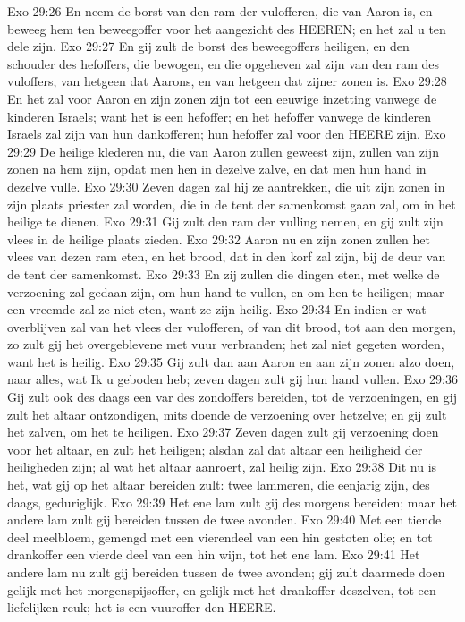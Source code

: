 Exo 29:26  En neem de borst van den ram der vulofferen, die van Aaron is, en beweeg hem ten beweegoffer voor het aangezicht des HEEREN; en het zal u ten dele zijn.
Exo 29:27  En gij zult de borst des beweegoffers heiligen, en den schouder des hefoffers, die bewogen, en die opgeheven zal zijn van den ram des vuloffers, van hetgeen dat Aarons, en van hetgeen dat zijner zonen is.
Exo 29:28  En het zal voor Aaron en zijn zonen zijn tot een eeuwige inzetting vanwege de kinderen Israels; want het is een hefoffer; en het hefoffer vanwege de kinderen Israels zal zijn van hun dankofferen; hun hefoffer zal voor den HEERE zijn.
Exo 29:29  De heilige klederen nu, die van Aaron zullen geweest zijn, zullen van zijn zonen na hem zijn, opdat men hen in dezelve zalve, en dat men hun hand in dezelve vulle.
Exo 29:30  Zeven dagen zal hij ze aantrekken, die uit zijn zonen in zijn plaats priester zal worden, die in de tent der samenkomst gaan zal, om in het heilige te dienen.
Exo 29:31  Gij zult den ram der vulling nemen, en gij zult zijn vlees in de heilige plaats zieden.
Exo 29:32  Aaron nu en zijn zonen zullen het vlees van dezen ram eten, en het brood, dat in den korf zal zijn, bij de deur van de tent der samenkomst.
Exo 29:33  En zij zullen die dingen eten, met welke de verzoening zal gedaan zijn, om hun hand te vullen, en om hen te heiligen; maar een vreemde zal ze niet eten, want ze zijn heilig.
Exo 29:34  En indien er wat overblijven zal van het vlees der vulofferen, of van dit brood, tot aan den morgen, zo zult gij het overgeblevene met vuur verbranden; het zal niet gegeten worden, want het is heilig.
Exo 29:35  Gij zult dan aan Aaron en aan zijn zonen alzo doen, naar alles, wat Ik u geboden heb; zeven dagen zult gij hun hand vullen.
Exo 29:36  Gij zult ook des daags een var des zondoffers bereiden, tot de verzoeningen, en gij zult het altaar ontzondigen, mits doende de verzoening over hetzelve; en gij zult het zalven, om het te heiligen.
Exo 29:37  Zeven dagen zult gij verzoening doen voor het altaar, en zult het heiligen; alsdan zal dat altaar een heiligheid der heiligheden zijn; al wat het altaar aanroert, zal heilig zijn.
Exo 29:38  Dit nu is het, wat gij op het altaar bereiden zult: twee lammeren, die eenjarig zijn, des daags, geduriglijk.
Exo 29:39  Het ene lam zult gij des morgens bereiden; maar het andere lam zult gij bereiden tussen de twee avonden.
Exo 29:40  Met een tiende deel meelbloem, gemengd met een vierendeel van een hin gestoten olie; en tot drankoffer een vierde deel van een hin wijn, tot het ene lam.
Exo 29:41  Het andere lam nu zult gij bereiden tussen de twee avonden; gij zult daarmede doen gelijk met het morgenspijsoffer, en gelijk met het drankoffer deszelven, tot een liefelijken reuk; het is een vuuroffer den HEERE.
